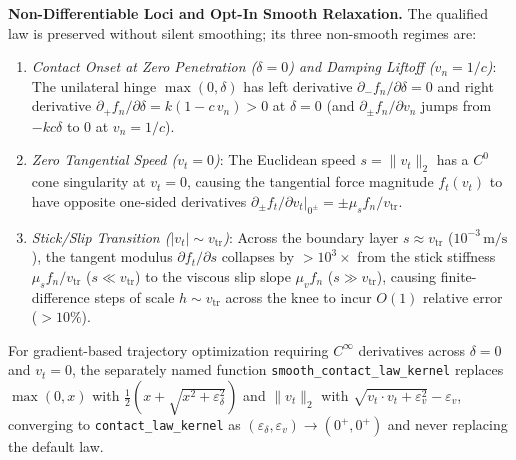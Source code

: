 \documentclass[11pt,a4paper]{article}
\begin{document}
\textbf{Non-Differentiable Loci and Opt-In Smooth Relaxation.}
The qualified law is preserved without silent smoothing; its three non-smooth regimes are:
\begin{enumerate}[leftmargin=*,noitemsep]
\item \textit{Contact Onset at Zero Penetration ($\delta = 0$) and Damping Liftoff ($v_n = 1/c$)}: The unilateral hinge $\max(0, \delta)$ has left derivative $\partial_- f_n / \partial \delta = 0$ and right derivative $\partial_+ f_n / \partial \delta = k(1 - c\,v_n) > 0$ at $\delta = 0$ (and $\partial_\pm f_n / \partial v_n$ jumps from $-k c \delta$ to $0$ at $v_n = 1/c$).
\item \textit{Zero Tangential Speed ($v_t = 0$)}: The Euclidean speed $s = \|v_t\|_2$ has a $C^0$ cone singularity at $v_t = 0$, causing the tangential force magnitude $f_t(v_t)$ to have opposite one-sided derivatives $\partial_\pm f_t / \partial v_t|_{0^\pm} = \pm \mu_s f_n / v_{\mathrm{tr}}$.
\item \textit{Stick/Slip Transition ($|v_t| \sim v_{\mathrm{tr}}$)}: Across the boundary layer $s \approx v_{\mathrm{tr}}$ ($10^{-3}\,\mathrm{m/s}$), the tangent modulus $\partial f_t / \partial s$ collapses by $> 10^3\times$ from the stick stiffness $\mu_s f_n / v_{\mathrm{tr}}$ ($s \ll v_{\mathrm{tr}}$) to the viscous slip slope $\mu_v f_n$ ($s \gg v_{\mathrm{tr}}$), causing finite-difference steps of scale $h \sim v_{\mathrm{tr}}$ across the knee to incur $O(1)$ relative error ($> 10\%$).
\end{enumerate}
For gradient-based trajectory optimization requiring $C^\infty$ derivatives across $\delta = 0$ and $v_t = 0$, the separately named function \texttt{smooth\_contact\_law\_kernel} replaces $\max(0, x)$ with $\frac{1}{2}(x + \sqrt{x^2 + \varepsilon_\delta^2})$ and $\|v_t\|_2$ with $\sqrt{v_t \cdot v_t + \varepsilon_v^2} - \varepsilon_v$, converging to \texttt{contact\_law\_kernel} as $(\varepsilon_\delta, \varepsilon_v) \to (0^+, 0^+)$ and never replacing the default law.
\end{document}
